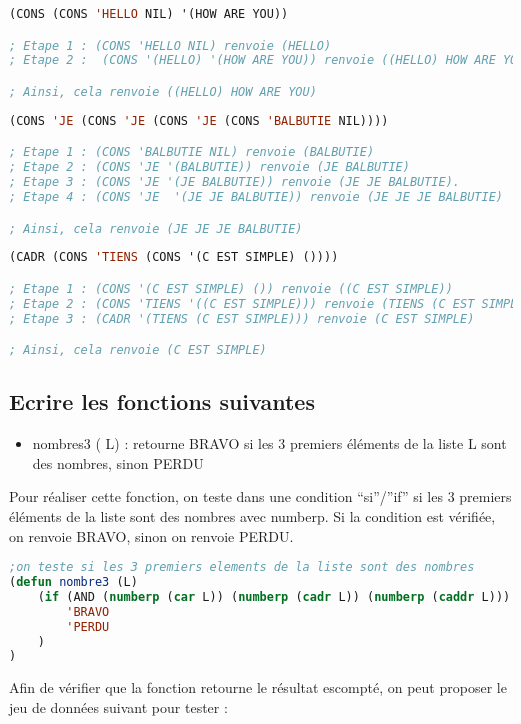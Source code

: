 \documentclass[a4paper, 12pt]{article}
\begin{document}
\begin{lstlisting}[language=Lisp]
(CONS (CONS 'HELLO NIL) '(HOW ARE YOU))

; Etape 1 : (CONS 'HELLO NIL) renvoie (HELLO)
; Etape 2 :  (CONS '(HELLO) '(HOW ARE YOU)) renvoie ((HELLO) HOW ARE YOU)

; Ainsi, cela renvoie ((HELLO) HOW ARE YOU)
\end{lstlisting}

\begin{lstlisting}[language=Lisp]
(CONS 'JE (CONS 'JE (CONS 'JE (CONS 'BALBUTIE NIL))))

; Etape 1 : (CONS 'BALBUTIE NIL) renvoie (BALBUTIE)
; Etape 2 : (CONS 'JE '(BALBUTIE)) renvoie (JE BALBUTIE)
; Etape 3 : (CONS 'JE '(JE BALBUTIE)) renvoie (JE JE BALBUTIE).
; Etape 4 : (CONS 'JE  '(JE JE BALBUTIE)) renvoie (JE JE JE BALBUTIE)

; Ainsi, cela renvoie (JE JE JE BALBUTIE)
\end{lstlisting}

\begin{lstlisting}[language=Lisp]
(CADR (CONS 'TIENS (CONS '(C EST SIMPLE) ())))

; Etape 1 : (CONS '(C EST SIMPLE) ()) renvoie ((C EST SIMPLE))
; Etape 2 : (CONS 'TIENS '((C EST SIMPLE))) renvoie (TIENS (C EST SIMPLE))
; Etape 3 : (CADR '(TIENS (C EST SIMPLE))) renvoie (C EST SIMPLE)

; Ainsi, cela renvoie (C EST SIMPLE)
\end{lstlisting}
\newpage
\subsection{Ecrire les fonctions suivantes}
\vspace{3mm}
\begin{itemize}[label=\textbullet]
    \item nombres3 ( L) : retourne BRAVO si les 3 premiers éléments de la liste L sont des nombres, sinon PERDU
\end{itemize}
\vspace{3mm}

Pour réaliser cette fonction, on teste dans une condition “si”/”if” si les 3 premiers éléments de la liste sont des nombres avec numberp. Si la condition est vérifiée, on renvoie BRAVO, sinon on renvoie PERDU.
\vspace{2mm}
\begin{lstlisting}[language=Lisp]
    ;on teste si les 3 premiers elements de la liste sont des nombres
(defun nombre3 (L)
    (if (AND (numberp (car L)) (numberp (cadr L)) (numberp (caddr L)))
        'BRAVO
        'PERDU
    )
)
\end{lstlisting}
\vspace{2mm}
Afin de vérifier que la fonction retourne le résultat escompté, on peut proposer le jeu de données suivant pour tester :
\end{document}

